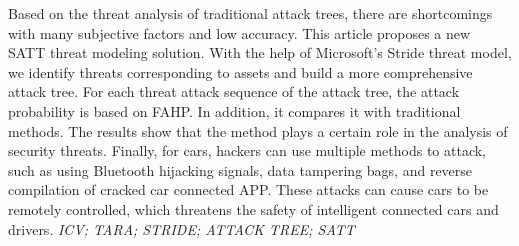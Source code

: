   Based on the threat analysis of traditional attack trees, there are shortcomings with many subjective factors and low accuracy. This article proposes a new SATT threat modeling solution. With the help of Microsoft's Stride threat model, we identify threats corresponding to assets and build a more comprehensive attack tree. For each threat attack sequence of the attack tree, the attack probability is based on FAHP. In addition, it compares it with traditional methods. The results show that the method plays a certain role in the analysis of security threats. Finally, for cars, hackers can use multiple methods to attack, such as using Bluetooth hijacking signals, data tampering bags, and reverse compilation of cracked car connected APP. These attacks can cause cars to be remotely controlled, which threatens the safety of intelligent connected cars and drivers.
  \newline
{}\textit{ICV; TARA; STRIDE; ATTACK TREE; SATT}